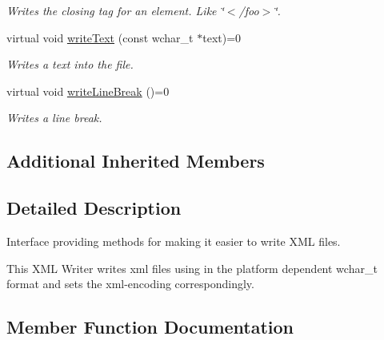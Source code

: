 \begin{DoxyCompactItemize}
\begin{DoxyCompactList}\small\item\em Writes the closing tag for an element. Like \char`\"{}$<$/foo$>$\char`\"{}. \end{DoxyCompactList}\item 
virtual void \hyperlink{classirr_1_1io_1_1IXMLWriter_a321adae57bcf06aadd2dda57eba1e4a6}{write\+Text} (const wchar\+\_\+t $\ast$text)=0
\begin{DoxyCompactList}\small\item\em Writes a text into the file. \end{DoxyCompactList}\item 
virtual void \hyperlink{classirr_1_1io_1_1IXMLWriter_a98d9b558d991211f77f6d3f2f68d30d2}{write\+Line\+Break} ()=0\hypertarget{classirr_1_1io_1_1IXMLWriter_a98d9b558d991211f77f6d3f2f68d30d2}{}\label{classirr_1_1io_1_1IXMLWriter_a98d9b558d991211f77f6d3f2f68d30d2}

\begin{DoxyCompactList}\small\item\em Writes a line break. \end{DoxyCompactList}\end{DoxyCompactItemize}
\subsection*{Additional Inherited Members}


\subsection{Detailed Description}
Interface providing methods for making it easier to write X\+ML files. 

This X\+ML Writer writes xml files using in the platform dependent wchar\+\_\+t format and sets the xml-\/encoding correspondingly. 

\subsection{Member Function Documentation}
